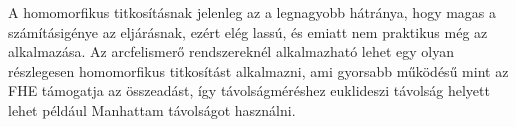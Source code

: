 A homomorfikus titkosításnak jelenleg az a legnagyobb hátránya, hogy magas a számításigénye az eljárásnak, ezért elég lassú, és emiatt nem praktikus még az alkalmazása. Az arcfelismerő rendszereknél alkalmazható lehet egy olyan részlegesen homomorfikus titkosítást alkalmazni, ami gyorsabb működésű mint az FHE támogatja az összeadást, így távolságméréshez euklideszi távolság helyett lehet például Manhattam távolságot használni.





